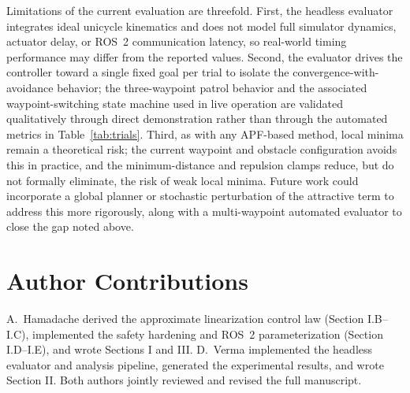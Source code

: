 \documentclass[conference]{IEEEtran}
\begin{document}
Limitations of the current evaluation are threefold. First, the headless evaluator integrates ideal unicycle kinematics and does not model full simulator dynamics, actuator delay, or ROS~2 communication latency, so real-world timing performance may differ from the reported values. Second, the evaluator drives the controller toward a single fixed goal per trial to isolate the convergence-with-avoidance behavior; the three-waypoint patrol behavior and the associated waypoint-switching state machine used in live operation are validated qualitatively through direct demonstration rather than through the automated metrics in Table~\ref{tab:trials}. Third, as with any APF-based method, local minima remain a theoretical risk; the current waypoint and obstacle configuration avoids this in practice, and the minimum-distance and repulsion clamps reduce, but do not formally eliminate, the risk of weak local minima. Future work could incorporate a global planner or stochastic perturbation of the attractive term to address this more rigorously, along with a multi-waypoint automated evaluator to close the gap noted above.

\section*{Author Contributions}
A.\ Hamadache derived the approximate linearization control law (Section I.B--I.C), implemented the safety hardening and ROS~2 parameterization (Section I.D--I.E), and wrote Sections I and III. D.\ Verma implemented the headless evaluator and analysis pipeline, generated the experimental results, and wrote Section II. Both authors jointly reviewed and revised the full manuscript.
\end{document}

